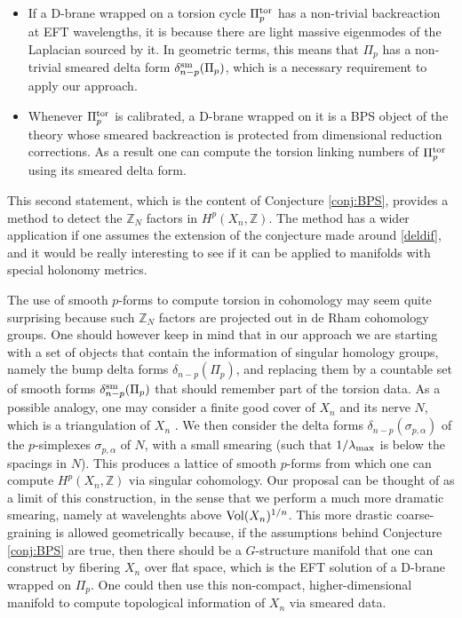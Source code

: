 \documentclass[11pt]{article}
\def\a {\alpha}
\newcommand{\IZ}{\mathbb{Z}}
\begin{document}
\begin{itemize}

\item[{\it i)}] If a D-brane wrapped on a torsion cycle $\Pi_p^{\rm tor}$ has a non-trivial backreaction at EFT wavelengths, it is because there are light massive eigenmodes of the Laplacian sourced by it. In geometric terms, this means that $\Pi_p$ has a non-trivial smeared delta form $\delta^{\rm sm}_{n-p} (\Pi_p)$, which is a necessary requirement to apply our approach. 


\item[{\it ii)}] Whenever $\Pi_p^{\rm tor}$ is calibrated, a D-brane wrapped on it is a BPS object of the theory whose smeared backreaction is protected from  dimensional reduction corrections. As a result one can compute the torsion linking numbers of $\Pi_p^{\rm tor}$ using its smeared delta form. 
\end{itemize}

This second statement, which is the content of Conjecture \ref{conj:BPS}, provides a method to detect the $\IZ_N$ factors in $H^p(X_n, \IZ)$. The method has a wider application if one assumes the extension of the conjecture made around \eqref{deldif}, and it would be really interesting to see if it can be applied to manifolds with special holonomy metrics. 

The use of smooth $p$-forms to compute torsion in cohomology may seem quite surprising because such $\IZ_N$ factors are projected out in de Rham cohomology groups. One should however keep in mind that in our approach we are starting with a set of objects that contain the information of singular homology groups, namely the bump delta forms $\delta_{n-p} (\Pi_p)$, and replacing them by a countable set of smooth forms $\delta_{n-p}^{\rm sm} (\Pi_p)$ that should remember part of the torsion data. As a possible analogy, one may consider a finite good cover of $X_n$ and its nerve $N$, which is a triangulation of $X_n$ \cite{Bott1982DifferentialFI}. We then consider the delta forms $\delta_{n-p} (\sigma_{p, \a})$ of the $p$-simplexes $\sigma_{p, \a}$ of $N$, with a small smearing (such that $1/\lambda_{\rm max}$ is below the spacings in $N$). This produces a lattice of smooth $p$-forms from which one can compute $H^p(X_n, \IZ)$ via singular cohomology. Our proposal can be thought of as a limit of this construction, in the sense that we perform a much more dramatic smearing, namely at wavelenghts above ${\rm Vol}(X_n)^{1/n}$.  This more drastic coarse-graining is allowed geometrically because, if the assumptions behind Conjecture \ref{conj:BPS} are true, then there should be a $G$-structure manifold that one can construct by fibering $X_n$ over flat space, which is the EFT solution of a D-brane wrapped on $\Pi_p$. One could then use this non-compact, higher-dimensional manifold to compute topological information of $X_n$ via smeared data. 
\end{document}
